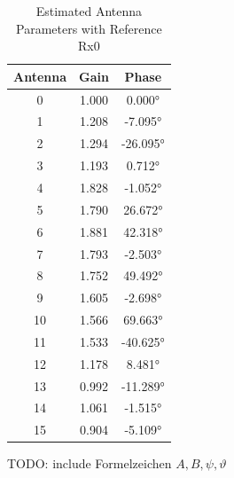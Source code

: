 \begin{table}[h]
\begin{subtable}[t]{0.4\textwidth}
    \end{subtable}
    \begin{subtable}[t]{0.4\textwidth}
        \begin{tabular}{ccc}
            \hline
            {Antenna} & {Gain} & {Phase}  \\
            \hline
            0         & 1.000  & 0.000°   \\
            1         & 1.208  & -7.095°  \\
            2         & 1.294  & -26.095° \\
            3         & 1.193  & 0.712°   \\
            4         & 1.828  & -1.052°  \\
            5         & 1.790  & 26.672°  \\
            6         & 1.881  & 42.318°  \\
            7         & 1.793  & -2.503°  \\
            8         & 1.752  & 49.492°  \\
            9         & 1.605  & -2.698°  \\
            10        & 1.566  & 69.663°  \\
            11        & 1.533  & -40.625° \\
            12        & 1.178  & 8.481°   \\
            13        & 0.992  & -11.289° \\
            14        & 1.061  & -1.515°  \\
            15        & 0.904  & -5.109°  \\
            \hline
        \end{tabular}
        \label{tab:rx_gains}
    \end{subtable}
    \caption{Estimated Antenna Parameters with Reference Rx0}
\end{table}

TODO: include Formelzeichen $A,B, \psi, \vartheta$
